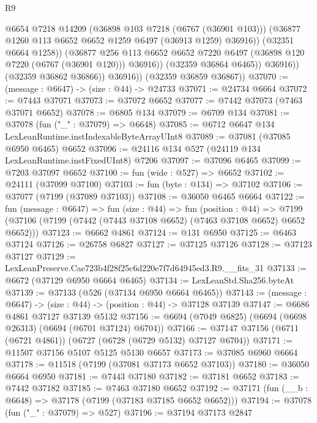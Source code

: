 \begin{lexlean}{R9}
\begin{coremodule}
                        @6654
                        @7218
                        @14209
                        (@36898 @103 @7218 (@6767 (@36901 @103)))
                        (@36877 @1260 @113 @6652 @6652 @1259 @6497 (@36913 @1259) @36916))
                      (@32351 @6664 @1258))
                    (@36877
                      @256
                      @113
                      @6652
                      @6652
                      @7220
                      @6497
                      (@36898 @120 @7220 (@6767 (@36901 @120)))
                      @36916))
                  (@32359 @36864 @6465))
                @36916))
            (@32359 @36862 @36866))
          @36916))
      (@32359 @36859 @36867))
@37070 := (message : @6647) -> (size : @44) -> @24733
@37071 := @24734 @6664
@37072 := @7443 @37071
@37073 := @37072 @6652
@37077 := @7442 @37073 (@7463 @37071 @6652)
@37078 := @6805 @134
@37079 := @6709 @134
@37081 := @37078 (fun ("_" : @37079) => @6648)
@37085 := @6712 @6647 @134 LexLeanRuntime.instIndexableByteArrayUInt8
@37089 := @37081 (@37085 @6950 @6465) @6652
@37096 := @24116 @134 @527 (@24119 @134 LexLeanRuntime.instFixedUInt8) @7206
@37097 := @37096 @6465
@37099 := @7203 @37097 @6652
@37100 := fun (wide : @527) => @6652
@37102 := @24111 (@37099 @37100)
@37103 := fun (byte : @134) => @37102
@37106 := @37077 (@7199 (@37089 @37103))
@37108 := @36050 @6465 @6664
@37122 := fun (message : @6647) =>
  fun (size : @44) =>
  fun (position : @44) =>
  @7199 (@37106 (@7199 (@7442 (@7443 @37108 @6652) (@7463 @37108 @6652) @6652 @6652)))
@37123 := @6662 @4861
@37124 := @131 @6950
@37125 := @6463 @37124
@37126 := @26758 @6827
@37127 := @37125 @37126
@37128 := @37123 @37127
@37129 := LexLeanPreserve.Cae723b4f28f25c6d220e7f7d64945ed3.R9.__fits_31
@37133 := @6672 (@37129 @6950 @6664 @6465)
@37134 := LexLeanStd.Sha256.byteAt
@37139 := @37133 (@526 (@37134 @6950 @6664 @6465))
@37143 := (message : @6647) -> (size : @44) -> (position : @44) -> @37128 @37139
@37147 := @6686 @4861 @37127 @37139 @5132
@37156 := @6694 (@7049 @6825) (@6694 (@6698 @26313) (@6694 (@6701 @37124) @6704))
@37166 := @37147 @37156 (@6711 (@6721 @4861)) (@6727 (@6728 (@6729 @5132) @37127 @6704))
@37171 := @11507 @37156 @5107 @5125 @5130 @6657
@37173 := @37085 @6960 @6664
@37178 := @11518 (@7199 (@37081 @37173 @6652 @37103))
@37180 := @36050 @6664 @6950
@37181 := @7443 @37180
@37182 := @37181 @6652
@37183 := @7442 @37182
@37185 := @7463 @37180 @6652
@37192 := @37171 (fun (__b : @6648) => @37178 (@7199 (@37183 @37185 @6652 @6652)))
@37194 := @37078 (fun ("_" : @37079) => @527)
@37196 := @37194 @37173 @2847

\end{coremodule}
\end{lexlean}
